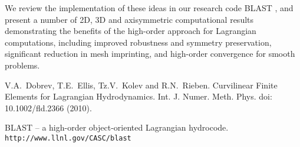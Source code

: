 We review the implementation of these ideas in our research code BLAST \cite{BLAST}, and present a number of 2D, 3D and axisymmetric computational results demonstrating the benefits of the high-order approach for Lagrangian computations, including improved robustness and symmetry preservation, significant reduction in mesh imprinting, and high-order convergence for smooth problems.


\begin{thebibliography}{10}
{\sc V.A.~{Dobrev}, T.E.~{Ellis}, Tz.V.~{Kolev} and R.N.~{Rieben}}. {Curvilinear Finite Elements for {Lagrangian} Hydrodynamics}. Int. J. Numer. Meth. Phys. doi: 10.1002/fld.2366 (2010).

 {BLAST -- a high-order object-oriented Lagrangian hydrocode}. {\tt http://www.llnl.gov/CASC/blast}
\end{thebibliography}